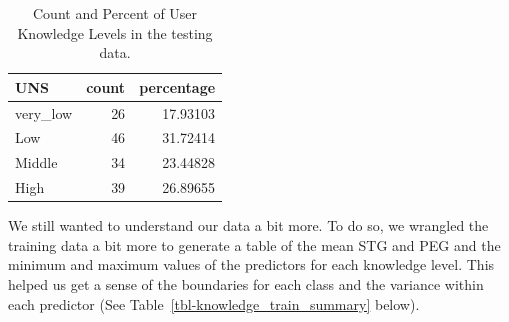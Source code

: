\documentclass[
  letterpaper,
  DIV=11,
  numbers=noendperiod]{scrartcl}
\begin{document}
\begin{longtable}[]{@{}lrr@{}}

\caption{\label{tbl-know_percentage_test}Count and Percent of User
Knowledge Levels in the testing data.}

\tabularnewline

\toprule\noalign{}
UNS & count & percentage \\
\midrule\noalign{}
\endhead
\bottomrule\noalign{}
\endlastfoot
very\_low & 26 & 17.93103 \\
Low & 46 & 31.72414 \\
Middle & 34 & 23.44828 \\
High & 39 & 26.89655 \\

\end{longtable}

We still wanted to understand our data a bit more. To do so, we wrangled
the training data a bit more to generate a table of the mean STG and PEG
and the minimum and maximum values of the predictors for each knowledge
level. This helped us get a sense of the boundaries for each class and
the variance within each predictor (See
Table~\ref{tbl-knowledge_train_summary} below).
\end{document}
